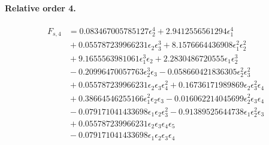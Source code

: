 \documentclass[10pt]{article}
\begin{document}
\paragraph{Relative order 4.}
\begin{align*}
F_{s,4} &= 0.083467005785127 \epsilon_{2}^{4} + 2.9412556561294 \epsilon_{1}^{4} \\
&{}  + 0.055787239966231 \epsilon_{2} \epsilon_{3}^{3} + 8.1576664436908 \epsilon_{1}^{2} \epsilon_{2}^{2} \\
&{}  + 9.1655563981061 \epsilon_{1}^{3} \epsilon_{2} + 2.2830486720555 \epsilon_{1} \epsilon_{2}^{3} \\
&{}  - 0.20996470057763 \epsilon_{2}^{3} \epsilon_{3} - 0.058660421836305 \epsilon_{2}^{2} \epsilon_{3}^{2} \\
&{}  + 0.055787239966231 \epsilon_{2} \epsilon_{3} \epsilon_{4}^{2} + 0.16736171989869 \epsilon_{2} \epsilon_{3}^{2} \epsilon_{4} \\
&{}  + 0.38664546255166 \epsilon_{1}^{2} \epsilon_{2} \epsilon_{3} - 0.016062214045699 \epsilon_{2}^{2} \epsilon_{3} \epsilon_{4} \\
&{}  - 0.079171041433698 \epsilon_{1} \epsilon_{2} \epsilon_{3}^{2} - 0.91389525644738 \epsilon_{1} \epsilon_{2}^{2} \epsilon_{3} \\
&{}  + 0.055787239966231 \epsilon_{2} \epsilon_{3} \epsilon_{4} \epsilon_{5} \\
&{}  - 0.079171041433698 \epsilon_{1} \epsilon_{2} \epsilon_{3} \epsilon_{4}
\end{align*}
\end{document}
